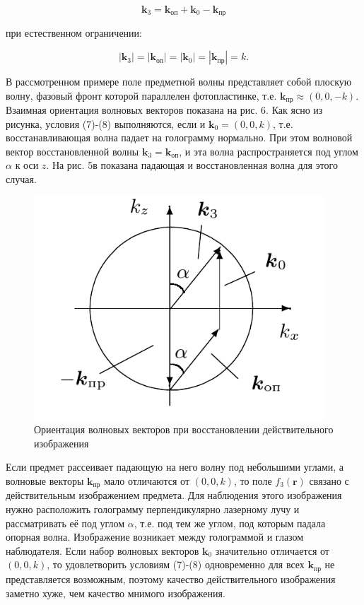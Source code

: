 \documentclass[a4paper,12pt]{article}
\begin{document}
$$
\mathbf{k}_3 = \mathbf{k}_{\text{оп}} + \mathbf{k}_0 - \mathbf{k}_{\text{пр}}
$$

при естественном ограничении:

$$
|\mathbf{k}_3| = |\mathbf{k}_{\text{оп}}| = |\mathbf{k}_0| = |\mathbf{k}_{\text{пр}}| = k.
$$

В рассмотренном примере поле предметной волны представляет собой плоскую волну, фазовый фронт которой параллелен фотопластинке, т.е. $\mathbf{k}_{\text{пр}} \approx (0, 0, -k)$. Взаимная ориентация волновых векторов показана на рис. 6. Как ясно из рисунка, условия (7)-(8) выполняются, если и $\mathbf{k}_0 = (0, 0, k)$, т.е. восстанавливающая волна падает на голограмму нормально. При этом волновой вектор восстановленной волны $\mathbf{k}_3 = \mathbf{k}_{\text{оп}}$, и эта волна распространяется под углом $\alpha$ к оси $z$. На рис. 5в показана падающая и восстановленная волна для этого случая.

\begin{figure}[h]
\centering
\includegraphics[width=0.6\linewidth]{img5.png}
\caption{Ориентация волновых векторов при восстановлении действительного изображения}
\label{img5}
\end{figure}

Если предмет рассеивает падающую на него волну под небольшими углами, а волновые векторы $\mathbf{k}_{\text{пр}}$ мало отличаются от $(0, 0, k)$, то поле $f_3(\mathbf{r})$ связано с действительным изображением предмета. Для наблюдения этого изображения нужно расположить голограмму перпендикулярно лазерному лучу и рассматривать её под углом $\alpha$, т.е. под тем же углом, под которым падала опорная волна. Изображение возникает между голограммой и глазом наблюдателя. Если набор волновых векторов $\mathbf{k}_0$ значительно отличается от $(0, 0, k)$, то удовлетворить условиям (7)-(8) одновременно для всех $\mathbf{k}_{\text{пр}}$ не представляется возможным, поэтому качество действительного изображения заметно хуже, чем качество мнимого изображения.
\end{document}
